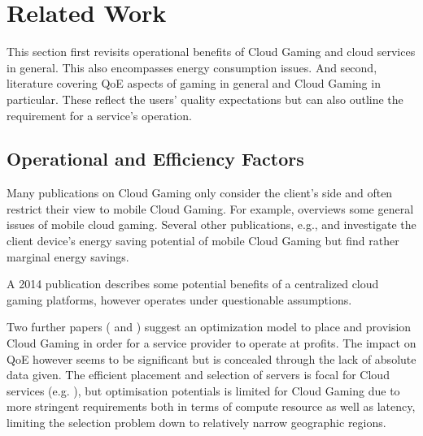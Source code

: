 \section{Related Work}
\label{sec:relatedwork}


This section first revisits operational benefits of Cloud Gaming and cloud services in general. This also encompasses energy consumption issues.
And second, literature covering \gls{QoE} aspects of gaming in general and Cloud Gaming in particular. These reflect the users' quality expectations but can also outline the requirement for a service's operation.


\subsection{Operational and Efficiency Factors}

Many publications on Cloud Gaming only consider the client's side and often restrict their view to mobile Cloud Gaming. For example, \cite{Soliman2013} overviews some general issues of mobile cloud gaming. Several other publications, e.g., \cite{6924295} and \cite{Huang:2014:MCP:2755535.2755542} investigate the client device's energy saving potential of mobile Cloud Gaming but find rather marginal energy savings.


A 2014 publication \cite{6882299} describes some potential benefits of a centralized cloud gaming platforms, however operates under questionable assumptions. %

Two further papers (\cite{6853364} and \cite{6365107}) suggest an optimization model to place and provision Cloud Gaming  in order for a service provider to operate at profits. The impact on \gls{QoE} however seems to be significant but is concealed through the lack of absolute data given. The efficient placement and selection of servers is focal for Cloud services (e.g. \cite{6740249}), but optimisation potentials is limited for Cloud Gaming due to more stringent requirements both in terms of compute resource as well as latency, limiting the selection problem down to relatively narrow geographic regions.

